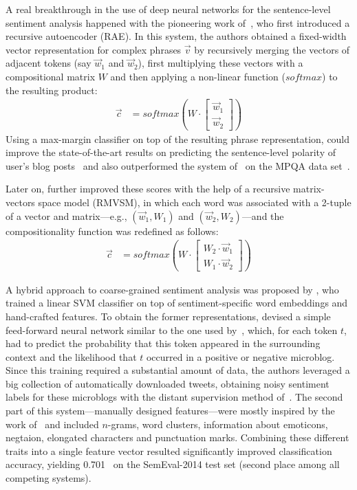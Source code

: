 
\citet{Yessenalina:11}

A real breakthrough in the use of deep neural networks for the
sentence-level sentiment analysis happened with the pioneering work
of~\citet{Socher:11}, who first introduced a recursive autoencoder
(RAE).  In this system, the authors obtained a fixed-width vector
representation for complex phrases $\vec{v}$ by recursively merging
the vectors of adjacent tokens (say $\vec{w}_1$ and $\vec{w}_2$),
first multiplying these vectors with a compositional matrix $W$ and
then applying a non-linear function ($softmax$) to the resulting
product:
\begin{align*}
  \vec{c} &= softmax\left(W\cdot\begin{bmatrix}
  \vec{w}_1\\
  \vec{w}_2
  \end{bmatrix}\right)
\end{align*}
Using a max-margin classifier on top of the resulting phrase
representation, \citet{Socher:11} could improve the state-of-the-art
results on predicting the sentence-level polarity of user's blog
posts~\cite{Potts:10} and also outperformed the system
of~\citet{Nasukawa:03} on the MPQA data set~\cite{Wiebe:05}.

Later on, \citet{Socher:12} further improved these scores with the
help of a recursive matrix-vectors space model (RMVSM), in which each
word was associated with a 2-tuple of a vector and matrix---e.g.,
$(\vec{w}_1, W_1)$ and $(\vec{w}_2, W_2)$---and the compositionality
function was redefined as follows:
\begin{align*}
  \vec{c} &= softmax\left(W\cdot\begin{bmatrix}
  W_2\cdot\vec{w}_1\\
  W_1\cdot\vec{w}_2
  \end{bmatrix}\right)
\end{align*}



A hybrid approach to coarse-grained sentiment analysis was proposed by
\citet{Tang:14b}, who trained a linear SVM classifier on top of
sentiment-specific word embeddings and hand-crafted features.  To
obtain the former representations, \citeauthor{Tang:14b} devised a
simple feed-forward neural network similar to the one used
by~\citet{Collobert:11}, which, for each token $t$, had to predict the
probability that this token appeared in the surrounding context and
the likelihood that $t$ occurred in a positive or negative microblog.
Since this training required a substantial amount of data, the authors
leveraged a big collection of automatically downloaded tweets,
obtaining noisy sentiment labels for these microblogs with the distant
supervision method of~\citet{Go:09}.  The second part of this
system---manually designed features---were mostly inspired by the work
of~\citet{Mohammad:13} and included $n$-grams, word clusters,
information about emoticons, negtaion, elongated characters and
punctuation marks.  Combining these different traits into a single
feature vector resulted significantly improved classification
accuracy, yielding 0.701~\F{} on the SemEval-2014 test set (second
place among all competing systems).

